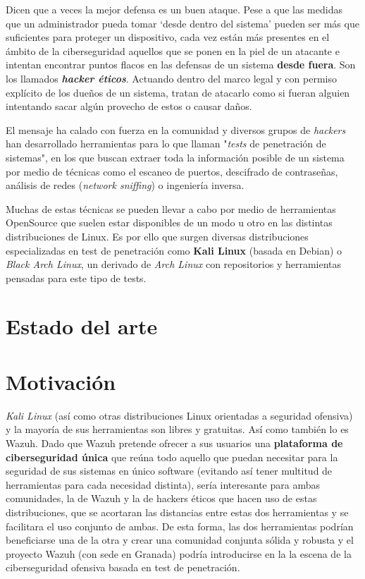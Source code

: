Dicen que a veces la mejor defensa es un buen ataque. Pese a que las medidas que un administrador pueda tomar `desde dentro del sistema' pueden ser más que suficientes para proteger un dispositivo, cada vez están más presentes en el ámbito de la ciberseguridad aquellos que se ponen en la piel de un atacante e intentan encontrar puntos flacos en las defensas de un sistema \textbf{desde fuera}. Son los llamados \textbf{\textit{hacker éticos}}. Actuando dentro del marco legal y con permiso explícito de los dueños de un sistema, tratan de atacarlo como si fueran alguien intentando sacar algún provecho de estos o causar daños.

El mensaje ha calado con fuerza en la comunidad y diversos grupos de \textit{hackers} han desarrollado herramientas para lo que llaman "\textit{tests} de penetración de sistemas", en los que buscan extraer toda la información posible de un sistema por medio de técnicas como el escaneo de puertos, descifrado de contraseñas, análisis de redes (\textit{network sniffing}) o ingeniería inversa. 

Muchas de estas técnicas se pueden llevar a cabo por medio de herramientas OpenSource que suelen estar disponibles de un modo u otro en las distintas distribuciones de Linux. Es por ello que surgen diversas distribuciones especializadas en test de penetración como \textbf{Kali Linux} (basada en Debian) o \textit{Black Arch Linux}, un derivado de \textit{Arch Linux} con repositorios y herramientas pensadas para este tipo de tests.




\section{Estado del arte}

\section{Motivación}

\textit{Kali Linux} (así como otras distribuciones Linux orientadas a seguridad ofensiva) y la mayoría de sus herramientas son libres y gratuitas. Así como también lo es Wazuh. Dado que Wazuh pretende ofrecer a sus usuarios una \textbf{plataforma de ciberseguridad única} que reúna todo aquello que puedan necesitar para la seguridad de sus sistemas en único software (evitando así tener multitud de herramientas para cada necesidad distinta), sería interesante para ambas comunidades, la de Wazuh y la de hackers éticos que hacen uso de estas distribuciones, que se acortaran las distancias entre estas dos herramientas y se facilitara el uso conjunto de ambas. De esta forma, las dos herramientas podrían beneficiarse una de la otra y crear una comunidad conjunta sólida y robusta y el proyecto Wazuh (con sede en Granada) podría introducirse en la la escena de la ciberseguridad ofensiva basada en test de penetración.

